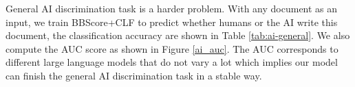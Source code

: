\documentclass[letterpaper]{article} %
\begin{document}
General AI discrimination task is a harder problem. With any document as an input, we train BBScore+CLF to predict whether humans or the AI write this document, the classification accuracy are shown in Table \ref{tab:ai-general}. We also compute the AUC score as shown in Figure \ref{ai_auc}. The AUC corresponds to different large language models that do not vary a lot which implies our model can finish the general AI discrimination task in a stable way.

\begin{table}[t!]
\centering
\small
{}
\caption{AI Generated Text Differentiation Results on WikiSection. $\clubsuit$: GPT2XL $\spadesuit$: GPT-NeoX $\vardiamondsuit$: LLaMA-7B $\varheartsuit$: LLaMA-13B $\diamondsuit$: LLaMA2-7B $\heartsuit$: LLaMA2-13B}
\label{tab:ai_diff}
\end{table}
\end{document}
